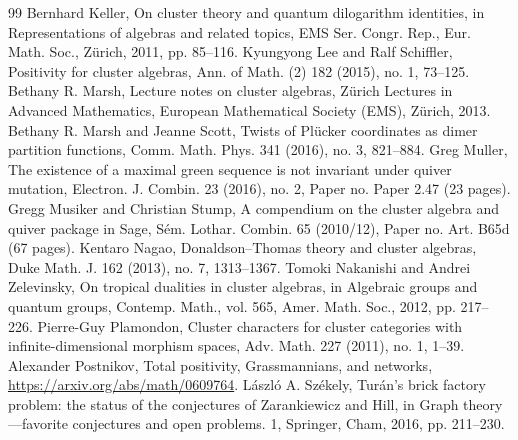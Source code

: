 \documentclass[10pt]{amsart}
\theoremstyle{definition}
\begin{document}
\begin{thebibliography}{99}
 Bernhard Keller, On cluster theory and quantum dilogarithm identities, in Representations of algebras and related topics, EMS Ser. Congr. Rep., Eur. Math. Soc., Zürich, 2011, pp. 85--116.
 Kyungyong Lee and Ralf Schiffler, Positivity for cluster algebras, Ann. of Math. (2) 182 (2015), no. 1, 73--125.
 Bethany R. Marsh, Lecture notes on cluster algebras, Zürich Lectures in Advanced Mathematics, European Mathematical Society (EMS), Zürich, 2013.
 Bethany R. Marsh and Jeanne Scott, Twists of Plücker coordinates as dimer partition functions, Comm. Math. Phys. 341 (2016), no. 3, 821--884.
 Greg Muller, The existence of a maximal green sequence is not invariant under quiver mutation, Electron. J. Combin. 23 (2016), no. 2, Paper no. Paper 2.47 (23 pages).
 Gregg Musiker and Christian Stump, A compendium on the cluster algebra and quiver package in Sage, Sém. Lothar. Combin. 65 (2010/12), Paper no. Art. B65d (67 pages).
 Kentaro Nagao, Donaldson--Thomas theory and cluster algebras, Duke Math. J. 162 (2013), no. 7, 1313--1367.
 Tomoki Nakanishi and Andrei Zelevinsky, On tropical dualities in cluster algebras, in Algebraic groups and quantum groups, Contemp. Math., vol. 565, Amer. Math. Soc., 2012, pp. 217--226.
 Pierre-Guy Plamondon, Cluster characters for cluster categories with infinite-dimensional morphism spaces, Adv. Math. 227 (2011), no. 1, 1--39.
 Alexander Postnikov, Total positivity, Grassmannians, and networks, \url{https://arxiv.org/abs/math/0609764}.
 László A. Székely, Turán's brick factory problem: the status of the conjectures of Zarankiewicz and Hill, in Graph theory---favorite conjectures and open problems. 1, Springer, Cham, 2016, pp. 211--230.
\end{thebibliography}
\end{document}

